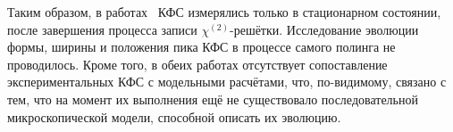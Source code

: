 Таким образом, в работах~\cite{farries1987second, bardal1991intensity} КФС измерялись только в стационарном состоянии, после завершения процесса записи $\chi^{(2)}$-решётки. Исследование эволюции формы, ширины и положения пика КФС в процессе самого полинга не проводилось. Кроме того, в обеих работах отсутствует сопоставление экспериментальных КФС с модельными расчётами, что, по-видимому, связано с тем, что на момент их выполнения ещё не существовало последовательной микроскопической модели, способной описать их эволюцию.

%
%
%
